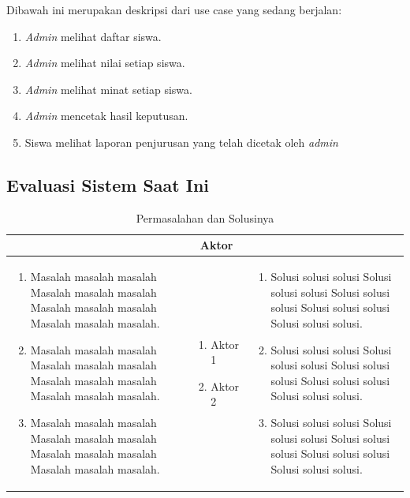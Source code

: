 \newpage
\noindent Dibawah ini merupakan deskripsi dari use case yang sedang berjalan:
\begin{enumerate}[nolistsep,leftmargin=0.5cm]
\item \textit{Admin} melihat daftar siswa.
\item \textit{Admin} melihat nilai setiap siswa.
\item \textit{Admin} melihat minat setiap siswa.
\item \textit{Admin} mencetak hasil keputusan.
\item Siswa melihat laporan penjurusan yang telah dicetak oleh \textit{admin}
\end{enumerate}

\subsection{Evaluasi Sistem Saat Ini}

\begin{table}[ht]
\centering
\caption{Permasalahan dan Solusinya}
\begin{tabular}{|>{\raggedright}p{5cm}|p{2.5cm}|>{\raggedright}p{5cm}|}
 \hline
 \multicolumn{1}{|c}{\bfseries Masalah} & \multicolumn{1}{|c|}{\bfseries Aktor} & \multicolumn{1}{c|}{\bfseries Solusi} \\ 
  \hline
\begin{enumerate}
   	\item Masalah masalah masalah Masalah masalah masalah Masalah masalah masalah Masalah masalah masalah.
   	\item Masalah masalah masalah Masalah masalah masalah Masalah masalah masalah Masalah masalah masalah.
   	\item Masalah masalah masalah Masalah masalah masalah Masalah masalah masalah Masalah masalah masalah.
   \end{enumerate} &
   \begin{enumerate}
  	\item Aktor 1
  	\item Aktor 2
  \end{enumerate} &
  \begin{enumerate}
  \item Solusi solusi solusi Solusi solusi solusi Solusi solusi solusi Solusi solusi solusi Solusi solusi solusi.
  \item Solusi solusi solusi Solusi solusi solusi Solusi solusi solusi Solusi solusi solusi Solusi solusi solusi.
  \item Solusi solusi solusi Solusi solusi solusi Solusi solusi solusi Solusi solusi solusi Solusi solusi solusi.
  \end{enumerate}
     \tabularnewline
  \hline
 \end{tabular}
\end{table}

